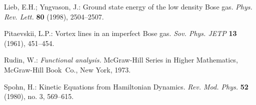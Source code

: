 \documentclass[11pt]{article}
\begin{document}
 Lieb, E.H.; Yngvason, J.: Ground state energy of the low
density {B}ose gas. \textit{Phys. Rev. Lett.} \textbf{80} (1998),
2504--2507.

 Pitaevskii, L.P.: Vortex lines in an imperfect {B}ose
gas. \textit{Sov. Phys. JETP} \textbf{13} (1961), 451--454.


 Rudin, W.: {\sl Functional analysis.}
McGraw-Hill Series in Higher Mathematics, McGraw-Hill Book~Co., New
York, 1973.

 Spohn, H.: Kinetic Equations from Hamiltonian Dynamics.
   \textit{Rev. Mod. Phys.} \textbf{52} (1980), no. 3, 569--615.
\end{document}
